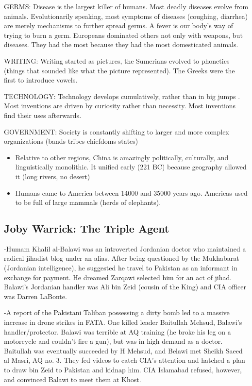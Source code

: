 \documentclass[
]{article}
\begin{document}
GERMS: Disease is the largest killer of humans. Most deadly diseases
evolve from animals. Evolutionarily speaking, most symptoms of diseases
(coughing, diarrhea) are merely mechanisms to further spread germs. A
fever is our body's way of trying to burn a germ. Europeans dominated
others not only with weapons, but diseases. They had the most because
they had the most domesticated animals.

WRITING: Writing started as pictures, the Sumerians evolved to phonetics
(things that sounded like what the picture represented). The Greeks were
the first to introduce vowels.

TECHNOLOGY: Technology develops cumulatively, rather than in big jumps .
Most inventions are driven by curiosity rather than necessity. Most
inventions find their uses afterwards.

GOVERNMENT: Society is constantly shifting to larger and more complex
organizations (bands-tribes-chiefdoms-states)

\begin{itemize}
\item
  Relative to other regions, China is amazingly politically, culturally,
  and linguistically monolithic. It unified early (221 BC) because
  geography allowed it (long rivers, no desert)
\item
  Humans came to America between 14000 and 35000 years ago. Americas
  used to be full of large mammals (herds of elephants).
\end{itemize}

\hypertarget{joby-warrick-the-triple-agent}{%
\subsection{Joby Warrick: The Triple
Agent}\label{joby-warrick-the-triple-agent}}

-Humam Khalil al-Balawi was an introverted Jordanian doctor who
maintained a radical jihadist blog under an alias. After being
questioned by the Mukhabarat (Jordanian intelligence), he suggested he
travel to Pakistan as an informant in exchange for payment. He dreamed
Zarqawi selected him for an act of jihad. Balawi's Jordanian handler was
Ali bin Zeid (cousin of the King) and CIA officer was Darren LaBonte.

-A report of the Pakistani Taliban possessing a dirty bomb led to a
massive increase in drone strikes in FATA. One killed leader Baitullah
Mehsud, Balawi's handler/protector. Balawi was terrible at AQ training
(he broke his leg on a motorcycle and couldn't fire a gun), but was in
high demand as a doctor. Baitullah was eventually succeeded by H Mehsud,
and Belawi met Sheikh Saeed al-Masri, AQ no. 3. They fed videos to catch
CIA's attention and hatched a plan to draw bin Zeid to Pakistan and
kidnap him. CIA Islamabad refused, however, and convinced Balawi to meet
them at Khost.
\end{document}
